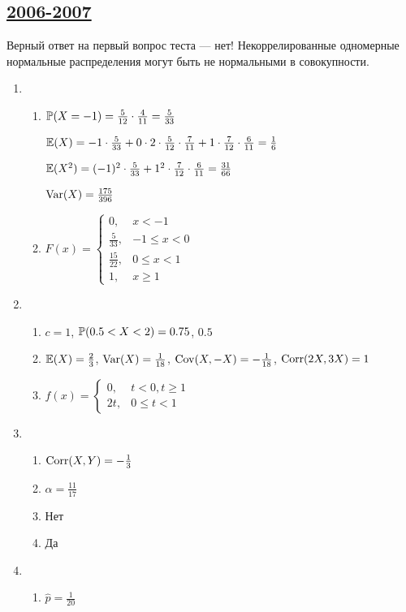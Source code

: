 \begin{enumerate}[resume]
\subsection[2006-2007]{\hyperref[sec:kr_03_2006_2007]{2006-2007}}
\label{sec:sol_kr_03_2006_2007}

Верный ответ на первый вопрос теста — нет! Некоррелированные одномерные нормальные распределения
могут быть не нормальными в совокупности.

\begin{enumerate}
\item
\begin{enumerate}
\item $\P(X=-1) = \frac{5}{12}\cdot\frac{4}{11} = \frac{5}{33}$

$\E(X) = -1 \cdot \frac{5}{33} + 0 \cdot 2 \cdot \frac{5}{12}\cdot\frac{7}{11} + 1 \cdot \frac{7}{12}\cdot\frac{6}{11} = \frac{1}{6}$

$\E(X^2) = (-1)^2 \cdot \frac{5}{33} + 1^2 \cdot \frac{7}{12}\cdot\frac{6}{11} = \frac{31}{66}$

$\Var(X) = \frac{175}{396}$
\item $F(x) = \begin{cases}
0, & x < -1 \\
\frac{5}{33}, & -1 \leq x < 0 \\
\frac{15}{22}, & 0 \leq x < 1 \\
1, & x \geq 1
\end{cases}$
\end{enumerate}
\item
\begin{enumerate}
\item $c=1$, $\P(0.5<X<2) = 0.75$, $0.5$
\item $\E(X) = \frac{2}{3}$, $\Var(X) = \frac{1}{18}$, $\Cov(X,-X) = - \frac{1}{18}$,
$\Corr(2X,3X) = 1$
\item $f(x) = \begin{cases}
0, & t < 0, t \geq 1 \\
2t, & 0 \leq t < 1
\end{cases}$
\end{enumerate}
\item
\begin{enumerate}
\item $\Corr(X,Y)=-\frac{1}{3}$
\item $\alpha=\frac{11}{17}$
\item Нет
\item Да
\end{enumerate}
\item
\begin{enumerate}
\item $\hat{p} = \frac{1}{20}$


\end{enumerate}
\end{enumerate}
\end{enumerate}
